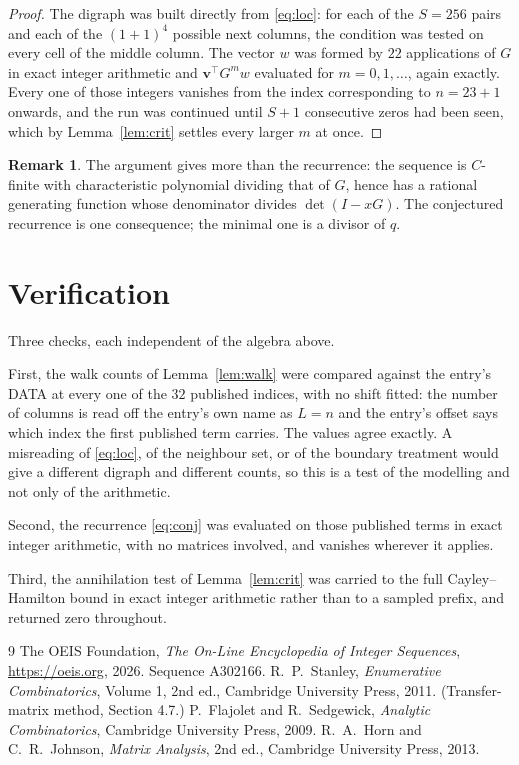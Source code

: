\documentclass[11pt,a4paper]{article}
\theoremstyle{plain}
\theoremstyle{definition}
\newtheorem{remark}[theorem]{Remark}
\begin{document}
\begin{proof}
The digraph was built directly from \eqref{eq:loc}: for each of the $S=256$ pairs and each
of the $(1+1)^{4}$ possible next columns, the condition was tested on every cell of
the middle column. The vector $w$ was formed by $22$ applications of $G$ in exact integer
arithmetic and $\mathbf{v}^{\!\top}G^{m}w$ evaluated for $m=0,1,\dots$, again exactly.
Every one of those integers vanishes from the index corresponding to $n=23+1$ onwards,
and the run was continued until $S+1$ consecutive zeros had been seen, which by
Lemma~\ref{lem:crit} settles every larger $m$ at once.
\end{proof}

\begin{remark}
The argument gives more than the recurrence: the sequence is $C$-finite with characteristic
polynomial dividing that of $G$, hence has a rational generating function whose denominator
divides $\det(I-xG)$. The conjectured recurrence is one consequence; the minimal one is a
divisor of $q$.
\end{remark}

\section{Verification}

Three checks, each independent of the algebra above.

First, the walk counts of Lemma~\ref{lem:walk} were compared against the entry's DATA at
every one of the $32$ published indices, with no shift fitted: the number of columns is
read off the entry's own name as $L=n$ and the entry's offset says which index the first
published term carries. The values agree exactly. A misreading of \eqref{eq:loc}, of the
neighbour set, or of the boundary treatment would give a different digraph and different
counts, so this is a test of the modelling and not only of the arithmetic.

Second, the recurrence \eqref{eq:conj} was evaluated on those published terms in exact
integer arithmetic, with no matrices involved, and vanishes wherever it applies.

Third, the annihilation test of Lemma~\ref{lem:crit} was carried to the full
Cayley--Hamilton bound in exact integer arithmetic rather than to a sampled prefix, and
returned zero throughout.

\begin{thebibliography}{9}
 The OEIS Foundation, \emph{The On-Line Encyclopedia of Integer
Sequences}, \url{https://oeis.org}, 2026. Sequence A302166.
 R.~P.~Stanley, \emph{Enumerative Combinatorics}, Volume 1, 2nd ed.,
Cambridge University Press, 2011. (Transfer-matrix method, Section 4.7.)
 P.~Flajolet and R.~Sedgewick, \emph{Analytic Combinatorics}, Cambridge
University Press, 2009.
 R.~A.~Horn and C.~R.~Johnson, \emph{Matrix Analysis}, 2nd ed., Cambridge
University Press, 2013.
\end{thebibliography}
\end{document}
